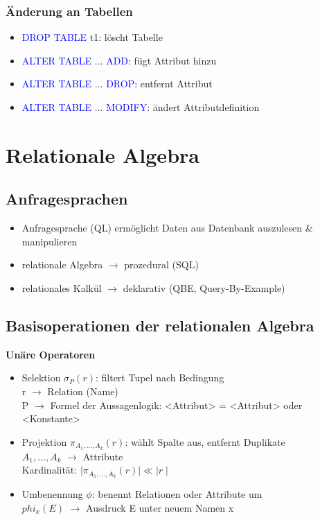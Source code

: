 \documentclass[12pt,a4paper]{article}
\begin{document}
\subsubsection{Änderung an Tabellen}

\begin{itemize}
\item \textcolor{blue}{DROP TABLE} t1: löscht Tabelle
\item \textcolor{blue}{ALTER TABLE} ... \textcolor{blue}{ADD}: fügt Attribut hinzu
\item \textcolor{blue}{ALTER TABLE} ... \textcolor{blue}{DROP}: entfernt Attribut
\item \textcolor{blue}{ALTER TABLE} ... \textcolor{blue}{MODIFY}: ändert Attributdefinition
\end{itemize}

\section{Relationale Algebra}

\subsection{Anfragesprachen}

\begin{itemize}
\item Anfragesprache (QL) ermöglicht Daten aus Datenbank auszulesen \& manipulieren
\item relationale Algebra $\rightarrow$ prozedural (SQL)
\item relationales Kalkül $\rightarrow$ deklarativ (QBE, Query-By-Example)
\end{itemize}

\subsection{Basisoperationen der relationalen Algebra}

\textbf{Unäre Operatoren}
\begin{itemize}
\item Selektion $\sigma_P(r)$: filtert Tupel nach Bedingung \\
r $\rightarrow$ Relation (Name) \\
P $\rightarrow$ Formel der Aussagenlogik: <Attribut> = <Attribut> oder <Konstante>
\item Projektion $\pi_{A_1,...,A_k}(r)$: wählt Spalte aus, entfernt Duplikate \\
$A_1,...,A_k$ $\rightarrow$ Attribute \\
Kardinalität: $\mid \pi_{A_1,...,A_k}(r) \mid \ll \mid r \mid$
\item Umbenennung $\phi$: benennt Relationen oder Attribute um \\
$phi_x(E)$ $\rightarrow$ Ausdruck E unter neuem Namen x
\end{itemize}
\end{document}
